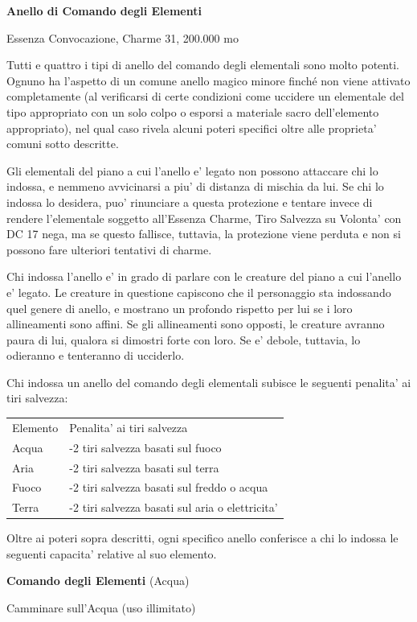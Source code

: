 \documentclass[a4paper,11pt,twoside,openany]{dndbook}
\begin{document}
{\textbf{Anello di Comando degli Elementi}

Essenza Convocazione, Charme 31, 200.000 mo

Tutti e quattro i tipi di anello del comando degli elementali sono molto potenti. Ognuno ha l'aspetto di un comune anello magico minore finché non viene attivato completamente (al verificarsi di certe condizioni come uccidere un elementale del tipo appropriato con un solo colpo o esporsi a materiale sacro dell'elemento appropriato), nel qual caso rivela alcuni poteri specifici oltre alle proprieta' comuni sotto descritte.

Gli elementali del piano a cui l'anello e' legato non possono attaccare chi lo indossa, e nemmeno avvicinarsi a piu' di distanza di mischia da lui. Se chi lo indossa lo desidera, puo' rinunciare a questa protezione e tentare invece di rendere l'elementale soggetto all'Essenza Charme, Tiro Salvezza su Volonta' con DC 17 nega, ma se questo fallisce, tuttavia, la protezione viene perduta e non si possono fare ulteriori tentativi di charme.

Chi indossa l'anello e' in grado di parlare con le creature del piano a cui l'anello e' legato. Le creature in questione capiscono che il personaggio sta indossando quel genere di anello, e mostrano un profondo rispetto per lui se i loro allineamenti sono affini. Se gli allineamenti sono opposti, le creature avranno paura di lui, qualora si dimostri forte con loro. Se e' debole, tuttavia, lo odieranno e tenteranno di ucciderlo.

Chi indossa un anello del comando degli elementali subisce le seguenti
penalita' ai tiri salvezza:

\begin{tabular}[c]{@{}ll@{}}
\toprule 
Elemento & Penalita' ai tiri salvezza\tabularnewline
Acqua & -2 tiri salvezza basati sul fuoco\tabularnewline
Aria & -2 tiri salvezza basati sul terra\tabularnewline
Fuoco & -2 tiri salvezza basati sul freddo o acqua\tabularnewline
Terra & -2 tiri salvezza basati sul aria o elettricita'\tabularnewline
\bottomrule
\end{tabular}

Oltre ai poteri sopra descritti, ogni specifico anello conferisce
a chi lo indossa le seguenti capacita' relative al suo elemento.

\textbf{Comando degli Elementi} (Acqua)

Camminare sull'Acqua (uso illimitato)

}
\end{document}
